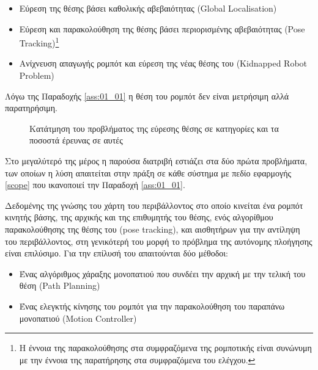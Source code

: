 \begin{itemize}
  \item Εύρεση της θέσης βάσει καθολικής αβεβαιότητας (Global Localisation)
  \item Εύρεση και παρακολούθηση της θέσης βάσει περιορισμένης αβεβαιότητας
        (Pose Tracking)\footnote{Η έννοια της παρακολούθησης στα συμφραζόμενα
        της ρομποτικής είναι συνώνυμη με την έννοια της παρατήρησης στα
        συμφραζόμενα του ελέγχου.}
  \item Ανίχνευση απαγωγής ρομπότ και εύρεση της νέας θέσης του (Kidnapped Robot
        Problem)
\end{itemize}

\begin{gg_box}
\begin{remark}
  Λόγω της Παραδοχής \ref{ass:01_01} η θέση του ρομπότ δεν είναι μετρήσιμη
  αλλά παρατηρήσιμη.
  \label{remark:observable}
\end{remark}
\end{gg_box}

\begin{figure}\centering
  \vspace{-1cm}
  
  \vspace{-2cm}
  \caption{\small Κατάτμηση του προβλήματος της εύρεσης θέσης σε κατηγορίες και
           τα ποσοστά έρευνας σε αυτές}
  \label{fig:localisation_problems_pie}
\end{figure}

Στο μεγαλύτερό της μέρος η παρούσα διατριβή εστιάζει στα δύο πρώτα προβλήματα,
των οποίων η λύση απαιτείται στην πράξη σε κάθε σύστημα με πεδίο εφαρμογής
\ref{scope} που ικανοποιεί την Παραδοχή \ref{ass:01_01}.

Δεδομένης της γνώσης του χάρτη του περιβάλλοντος στο οποίο κινείται ένα ρομπότ
κινητής βάσης, της αρχικής και της επιθυμητής του θέσης, ενός αλγορίθμου
παρακολούθησης της θέσης του (pose tracking), και αισθητήρων για την αντίληψη
του περιβάλλοντος, στη γενικότερή του μορφή το πρόβλημα της αυτόνομης πλοήγησης
είναι επιλύσιμο. Για την επίλυσή του απαιτούνται δύο μέθοδοι:

\begin{itemize}
  \item Ένας αλγόριθμος χάραξης μονοπατιού που συνδέει την αρχική με την τελική
        του θέση (Path Planning)
  \item Ένας ελεγκτής κίνησης του ρομπότ για την παρακολούθηση του παραπάνω
        μονοπατιού (Motion Controller)
\end{itemize}


